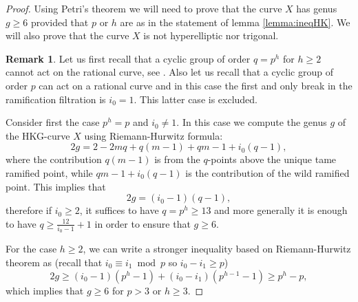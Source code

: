 \documentclass[11pt,letterpaper]{amsart}
\theoremstyle{definition}
\newtheorem{remark}[theorem]{Remark}
\renewcommand{\mod}{\bmod}
\begin{document}
\begin{proof}
Using Petri's theorem \cite{Saint-Donat73} we will need to prove that the curve $X$ has genus $g\geq 6$ provided that $p$ or $h$ are as in the statement of lemma \ref{lemma:ineqHK}.
 We will also prove that the curve $X$ is not hyperelliptic nor trigonal.

\begin{remark}
\label{rem:rat-act}
Let us first recall that a cyclic group of order $q=p^h$ for $h\geq2$ cannot act on the rational curve, see \cite[thm 1]{Val-Mad:80}. Also let us recall that a cyclic group of order $p$ can act on a rational curve and in this case the first and only break in the ramification filtration is $i_0=1$. This latter case is excluded.  
\end{remark}

Consider first the case $p^h=p$ and $i_0\neq 1$. 
In this case we compute the genus $g$  of the HKG-curve $X$ using Riemann-Hurwitz formula:
\[
2g=2-2mq + q(m-1) +qm-1+ i_0(q-1), 
\]
where the contribution $q(m-1)$ is from the $q$-points above the unique tame ramified point, while $qm-1+i_0(q-1)$ is the contribution of the wild ramified point. 
This implies that
\[
2g = (i_0-1)(q-1),  
\]
therefore if $i_0\geq2$, it suffices to have $q=p^h \geq 13$ and more generally  it is enough to have $q \geq \frac{12}{i_0-1}+1$ in order to ensure that $g\geq 6$. 

For the case  $h\geq2$, we can write a stronger inequality based on Riemann-Hurwitz theorem as (recall that $i_0\equiv i_1 \mod p$ so $i_0-i_1 \geq p$)
\begin{equation}
\label{ineq-genus}
2g \geq (i_0-1)(p^{h}-1) + (i_0-i_1)(p^{h-1}-1) \geq p^h-p,
\end{equation}
which implies that $g\geq 6$ for $p>3$ or $h\geq 3$.




\end{proof}
\end{document}

